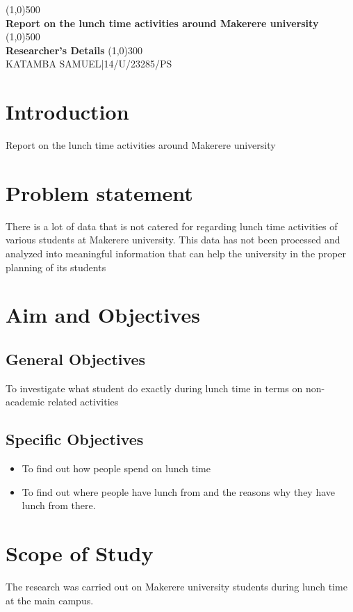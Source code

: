 \documentclass[12pt,a4paper]{article}
\begin{document}
\begin{titlepage}
    \begin{center}
\line(1,0){500}\\
\huge{\bfseries Report on the lunch time activities around Makerere university\\}
\line(1,0){500}\\
[0.25in]
\huge{\bfseries Researcher's Details}
\line(1,0){300}\\

KATAMBA SAMUEL|14/U/23285/PS\\

\end{center}
\end{titlepage}
\author{GROUP 122}
\section{Introduction}
Report on the lunch time activities around Makerere university
\section{Problem statement}
There is a lot of data that is not catered for regarding lunch time activities of various students at Makerere university. This data has not been processed and analyzed into meaningful information that can help the university in the proper planning of its students
\section{Aim and Objectives}
\subsection{General Objectives}
To investigate what student do exactly during lunch time in terms on non-academic related activities
\subsection{Specific Objectives}
\begin{itemize}
\item To find out how people spend on lunch time
\item To find out where people have lunch from and the reasons why they have lunch from there.
\end{itemize}

\section{Scope of Study}
The research was carried out on Makerere university students during lunch time at the main campus.
\end{document}
